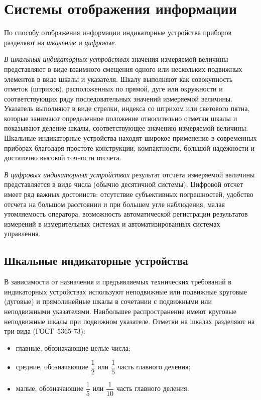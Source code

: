 \chapter{ Системы отображения информации}

По способу отображения информации индикаторные устройства приборов разделяют на \textit{шкальные} и \textit{цифровые}.

\textit{В шкальных индикаторных устройствах} значения измеряемой величины представляют в виде взаимного смещения одного или нескольких подвижных элементов в виде шкалы и указателя. Шкалу выполняют как совокупность отметок (штрихов), расположенных по прямой, дуге или окружности и соответствующих ряду последовательных значений измеряемой величины. Указатель выполняют в виде стрелки, индекса со штрихом или светового пятна, которые занимают определенное положение относительно отметки шкалы и показывают деление шкалы, соответствующее значению измеряемой величины. Шкальные индикаторные устройства находят широкое применение в современных приборах благодаря простоте конструкции, компактности, большой надежности и достаточно высокой точности отсчета.

\textit{В цифровых индикаторных устройствах} результат отсчета измеряемой величины представляется в виде числа (обычно десятичной системы). Цифровой отсчет имеет ряд важных достоинств: отсутствие субъективных погрешностей, удобство отсчета на большом расстоянии и при большем угле наблюдения, малая утомляемость оператора, возможность автоматической регистрации результатов измерений в измерительных системах и автоматизированных системах управления.

\section{Шкальные индикаторные устройства}

В зависимости от назначения и предъявляемых технических требований в индикаторных устройствах используют неподвижные или подвижные круговые (дуговые) и прямолинейные шкалы в сочетании с подвижными или неподвижными указателями. Наибольшее распространение имеют круговые неподвижные шкалы при подвижном указателе. Отметки на шкалах разделяют на три вида (ГОСТ~5365-73):
\begin{itemize}
\item главные, обозначающие целые числа;
\item средние, обозначающие $ \dfrac{1}{2} $  или $ \dfrac{1}{5} $ часть главного деления;
\item малые, обозначающие $ \dfrac{1}{5} $ или $ \dfrac{1}{10} $ часть главного деления.
\end{itemize}

